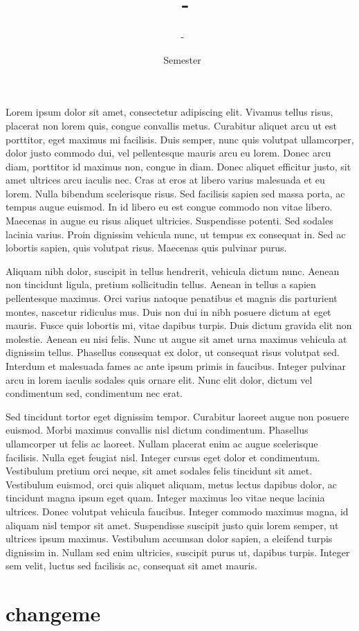 \documentclass[12pt]{article}
\title{\COURSECODE\ - \FULLCOURSENAME}
\author{\PROFESSORNAME\ - \STUDENTNAME}
\date{\SEMESTER\ Semester \YEAR}
\theoremstyle{plain}
\theoremstyle{definition}
\begin{document}
\maketitle

\hfill
Lorem ipsum dolor sit amet, consectetur adipiscing elit. Vivamus tellus risus, placerat non lorem quis, congue convallis metus. Curabitur aliquet arcu ut est porttitor, eget maximus mi facilisis. Duis semper, nunc quis volutpat ullamcorper, dolor justo commodo dui, vel pellentesque mauris arcu eu lorem. Donec arcu diam, porttitor id maximus non, congue in diam. Donec aliquet efficitur justo, sit amet ultrices arcu iaculis nec. Cras at eros at libero varius malesuada et eu lorem. Nulla bibendum scelerisque risus. Sed facilisis sapien sed massa porta, ac tempus augue euismod. In id libero eu est congue commodo non vitae libero. Maecenas in augue eu risus aliquet ultricies. Suspendisse potenti. Sed sodales lacinia varius. Proin dignissim vehicula nunc, ut tempus ex consequat in. Sed ac lobortis sapien, quis volutpat risus. Maecenas quis pulvinar purus.

Aliquam nibh dolor, suscipit in tellus hendrerit, vehicula dictum nunc. Aenean non tincidunt ligula, pretium sollicitudin tellus. Aenean in tellus a sapien pellentesque maximus. Orci varius natoque penatibus et magnis dis parturient montes, nascetur ridiculus mus. Duis non dui in nibh posuere dictum at eget mauris. Fusce quis lobortis mi, vitae dapibus turpis. Duis dictum gravida elit non molestie. Aenean eu nisi felis. Nunc ut augue sit amet urna maximus vehicula at dignissim tellus. Phasellus consequat ex dolor, ut consequat risus volutpat sed. Interdum et malesuada fames ac ante ipsum primis in faucibus. Integer pulvinar arcu in lorem iaculis sodales quis ornare elit. Nunc elit dolor, dictum vel condimentum sed, condimentum nec erat.

Sed tincidunt tortor eget dignissim tempor. Curabitur laoreet augue non posuere euismod. Morbi maximus convallis nisl dictum condimentum. Phasellus ullamcorper ut felis ac laoreet. Nullam placerat enim ac augue scelerisque facilisis. Nulla eget feugiat nisl. Integer cursus eget dolor et condimentum. Vestibulum pretium orci neque, sit amet sodales felis tincidunt sit amet. Vestibulum euismod, orci quis aliquet aliquam, metus lectus dapibus dolor, ac tincidunt magna ipsum eget quam. Integer maximus leo vitae neque lacinia ultrices. Donec volutpat vehicula faucibus. Integer commodo maximus magna, id aliquam nisl tempor sit amet. Suspendisse suscipit justo quis lorem semper, ut ultrices ipsum maximus. Vestibulum accumsan dolor sapien, a eleifend turpis dignissim in. Nullam sed enim ultricies, suscipit purus ut, dapibus turpis. Integer sem velit, luctus sed facilisis ac, consequat sit amet mauris.

\tableofcontents

\break


\section{changeme}
\end{document}
